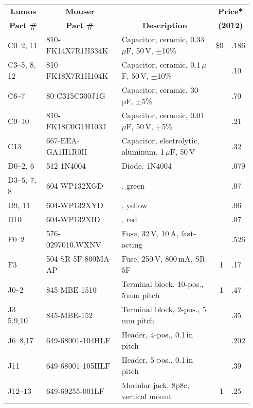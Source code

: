 \documentclass[letterpaper,twoside,onecolumn,openright,final]{memoir}
\begin{document}
\begin{table}
 \centerfloat
 \begin{tabular}{lllr@{}l}
  \toprule
  \multicolumn{1}{c}{\bfseries Lumos}
	&\multicolumn{1}{c}{\bfseries Mouser}
	&
	&\multicolumn{2}{c}{\bfseries Price*}
  \\
  \multicolumn{1}{c}{\bfseries Part \#}
	&\multicolumn{1}{c}{\bfseries Part \#}
	&\multicolumn{1}{c}{\bfseries Description}
	&\multicolumn{2}{c}{\bfseries (2012)}
  \\
  \midrule
     C0--2, 11& 810-FK14X7R1H334K	& Capacitor, ceramic, 0.33\,$\mu$F, 50\,V, $\pm$10\%	&\$0 	&.186\\
C3--5, 8, 12  & 810-FK18X7R1H104K	& Capacitor, ceramic, 0.1\,$\mu$F, 50\,V, $\pm$10\%	&	&.10 \\
	C6--7 & 80-C315C300J1G		& Capacitor, ceramic, 30\,pF, $\pm$5\%			&	&.70 \\
	C9--10& 810-FK18C0G1H103J	& Capacitor, ceramic, 0.01\,$\mu$F, 50\,V, $\pm$5\%	&	&.21 \\
	C13   & 667-EEA-GA1H1R0H	& Capacitor, electrolytic, aluminum, 1\,$\mu$F, 50\,V	&	&.32 \\
  \midrule
      D0--2, 6& 512-1N4004		& Diode, 1N4004						&	&.079\\
  D3--5, 7, 8 & 604-WP132XGD		& \acronym{LED}, green						&	&.07 \\
	D9, 11& 604-WP132XYD		& \acronym{LED}, yellow						&	&.06 \\
	D10   & 604-WP132XID		& \acronym{LED}, red						&	&.07 \\
  \midrule
	F0--2 & 576-0297010.WXNV	& Fuse, 32\,V, 10\,A, fast-acting			&	&.526\\
	F3    & 504-SR-5F-800MA-AP	& Fuse, 250\,V, 800\,mA, SR-5F				& 1	&.17 \\
  \midrule
 	J0--2 & 845-MBE-1510 		& Terminal block, 10-pos., 5\,mm pitch			& 1	&.47 \\
    J3--5,9,10& 845-MBE-152		& Terminal block, 2-pos., 5\,mm pitch			&	&.35 \\
     J6--8,17 & 649-68001-104HLF	& Header, 4-pos., 0.1\,in pitch				& 	&.202\\
          J11 & 649-68001-105HLF	& Header, 5-pos., 0.1\,in pitch				& 	&.39 \\
       J12--13& 649-69255-001LF		& Modular jack, 8p8c, vertical \acronym{PCB} mount	& 1	&.25 \\

\end{tabular}
\end{table}
\end{document}
